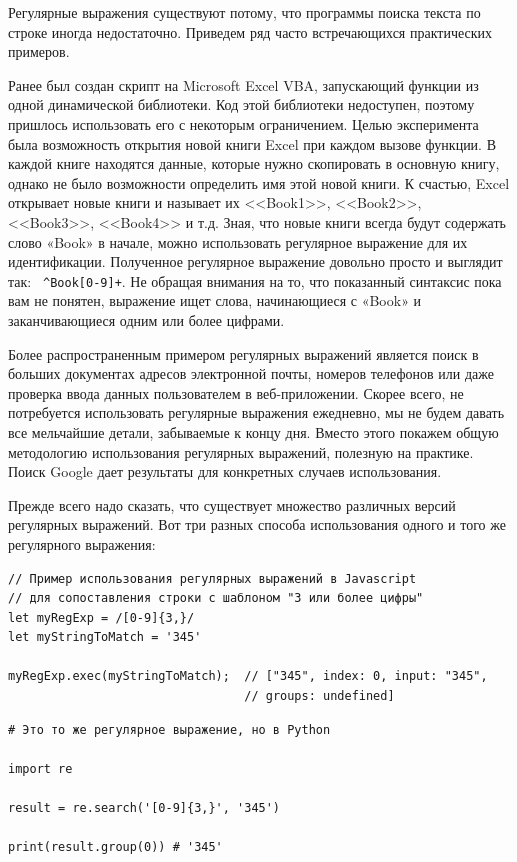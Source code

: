 \documentclass[12pt]{article}
\begin{document}
Регулярные выражения существуют потому, что программы поиска текста по
строке иногда недостаточно. Приведем ряд часто встречающихся
практических примеров.

Ранее был создан скрипт на Microsoft Excel VBA, запускающий функции из
одной динамической библиотеки. Код этой библиотеки недоступен, поэтому
пришлось использовать его с некоторым ограничением. Целью эксперимента
была возможность открытия новой книги Excel при каждом вызове функции. В
каждой книге находятся данные, которые нужно скопировать в основную
книгу, однако не было возможности определить имя этой новой книги. К
счастью, Excel открывает новые книги и называет их <<Book1>>, <<Book2>>,
<<Book3>>, <<Book4>> и т.д. Зная, что новые книги всегда будут содержать
слово «Book» в начале, можно использовать регулярное выражение для их
идентификации. Полученное регулярное выражение довольно просто и
выглядит так: \texttt{\ \^{}Book{[}0-9{]}+}. Не обращая внимания на то,
что показанный синтаксис пока вам не понятен, выражение ищет слова,
начинающиеся с «Book» и заканчивающиеся одним или более цифрами.

Более распространенным примером регулярных выражений является поиск в
больших документах адресов электронной почты, номеров телефонов или
даже проверка ввода данных пользователем в веб-приложении. Скорее всего,
не потребуется использовать регулярные выражения ежедневно, мы не будем
давать все мельчайшие детали, забываемые к концу дня. Вместо этого
покажем общую методологию использования регулярных выражений, полезную
на практике. Поиск Google дает результаты для конкретных случаев
использования.

Прежде всего надо сказать, что существует множество различных версий
регулярных выражений. Вот три разных способа использования одного и того
же регулярного выражения:

\begin{verbatim}
// Пример использования регулярных выражений в Javascript
// для сопоставления строки с шаблоном "3 или более цифры"
let myRegExp = /[0-9]{3,}/
let myStringToMatch = '345'

myRegExp.exec(myStringToMatch);  // ["345", index: 0, input: "345",
                                 // groups: undefined]
\end{verbatim}

\begin{verbatim}
# Это то же регулярное выражение, но в Python

import re

result = re.search('[0-9]{3,}', '345')

print(result.group(0)) # '345'
\end{verbatim}
\end{document}
